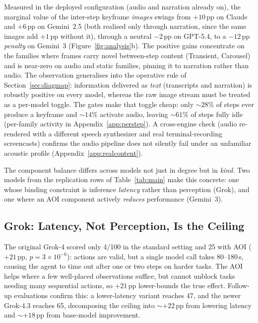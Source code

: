 \documentclass[11pt]{article}
\begin{document}
Measured in the deployed configuration (audio and narration already on), the
marginal value of the inter-step keyframe \emph{images} swings from $+10$\,pp on
Claude and $+6$\,pp on Gemini~2.5 (both realised only through narration, since the same
images add $+1$\,pp without it), through a neutral $-2$\,pp on GPT-5.4, to a
$-12$\,pp \emph{penalty} on Gemini~3 (Figure~\ref{fig:analysis}b).
The positive gains concentrate on the families where frames carry novel
between-step content (Transient, Carousel) and is near-zero on audio and static
families, pinning it to narration rather than audio.
The observation generalises into the operative rule of Section~\ref{sec:diagmap}:
information delivered as \emph{text} (transcripts and narration) is robustly
positive on every model, whereas the raw image stream must be treated as a
per-model toggle.
The gates make that toggle cheap: only ${\sim}28\%$ of steps ever produce a
keyframe and ${\sim}14\%$ activate audio, leaving ${\sim}61\%$ of steps fully idle
(per-family activity in Appendix~\ref{app:perstep}).
A cross-engine check (audio re-rendered with a different speech synthesizer and
real terminal-recording screencasts) confirms the audio pipeline does not
silently fail under an unfamiliar acoustic profile (Appendix~\ref{app:realcontent}).

The component balance differs across models not just in degree but in \emph{kind}. Two
models from the replication rows of Table~\ref{tab:main} make this concrete: one whose
binding constraint is inference \emph{latency} rather than perception (Grok), and one
where an AOI component actively \emph{reduces} performance (Gemini~3).

\subsection{Grok: Latency, Not Perception, Is the Ceiling}
\label{sec:grok}
The original Grok-4 scored only 4/100 in the standard setting and 25 with AOI ($+21$\,pp,
$p=3\times10^{-6}$): actions are valid, but a single model call takes 80--180\,s, causing
the agent to time out after one or two steps on harder tasks.
The AOI helps where a few well-placed observations suffice, but cannot unblock
tasks needing many sequential actions, so $+21$\,pp lower-bounds the true effect.
Follow-up evaluations confirm this: a lower-latency variant reaches 47, and the newer
Grok-4.3 reaches 65, decomposing the ceiling into ${\sim}{+}22$\,pp from lowering
latency and ${\sim}{+}18$\,pp from base-model improvement.
\end{document}
